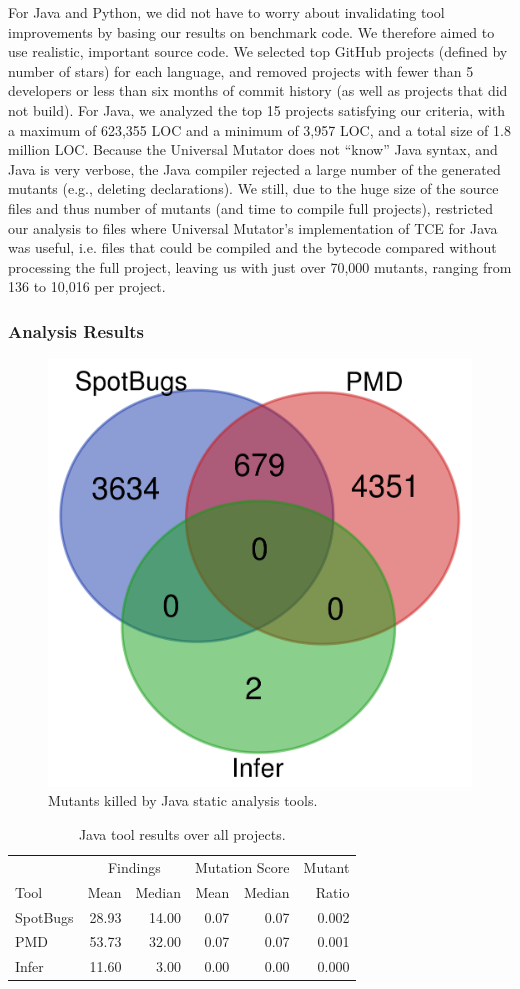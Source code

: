 For Java and Python, we did not have to worry about invalidating tool improvements by basing our results on benchmark code.  We therefore aimed to use realistic, important source code.  We selected top GitHub projects (defined by number of stars) for each language, and removed projects with fewer than 5 developers or less than six months of commit history (as well as projects that did not build).  For Java, we analyzed the top 15 projects satisfying our criteria, with a maximum of 623,355 LOC and a minimum of 3,957 LOC, and a total size of 1.8 million LOC.  Because the Universal Mutator does not ``know'' Java syntax, and Java is very verbose, the Java compiler rejected a large number of the generated mutants (e.g., deleting declarations).  We still, due to the huge size of the source files and thus number of mutants (and time to compile full projects), restricted our analysis to files where Universal Mutator's implementation of TCE \cite{TCE} for Java was useful, i.e. files that could be compiled and the bytecode compared without processing the full project, leaving us with just over 70,000 mutants, ranging from 136 to 10,016 per project.

\subsubsection{Analysis Results}


\begin{figure}
  \includegraphics[width=0.6\columnwidth]{java.png}
  \caption{Mutants killed by Java static analysis tools.}
  \label{fig:javavenn}
\end{figure}

\begin{table}
  \begin{tabular}{l|r|r|r|r|r}
    & \multicolumn{2}{|c|}{Findings} & \multicolumn{2}{|c|}{Mutation Score}  & Mutant \\
    Tool & Mean & Median & Mean & Median & Ratio\\
    \hline
    \hline
    SpotBugs & 28.93 & 14.00 & 0.07 & 0.07 & 0.002 \\
    \hline
    PMD & 53.73 & 32.00 & 0.07 & 0.07 & 0.001 \\
    \hline
    Infer & 11.60 & 3.00 & 0.00 & 0.00 &  0.000 \\
    \hline
  \end{tabular}
  \caption{Java tool results over all projects.}
  \label{tab:scorejava}
\end{table}

